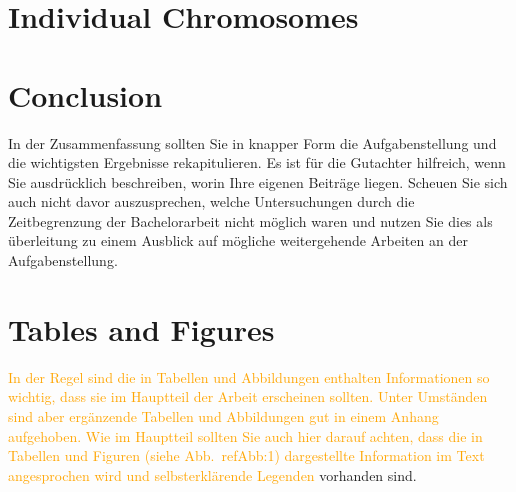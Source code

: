 \documentclass[a4paper,11pt,oneside,final,english,toc=bib,draft]{scrbook}
\begin{document}


\chapter{Individual Chromosomes} %
\label{cha:individual_chromosomes}


\chapter{Conclusion} %
\label{cha:conclusion}

In der Zusammenfassung sollten Sie in knapper Form die Aufgabenstellung 
und die wichtigsten Ergebnisse rekapitulieren. Es ist für die 
Gutachter hilfreich, wenn Sie ausdrücklich beschreiben, worin 
Ihre eigenen Beiträge liegen. Scheuen Sie sich auch nicht davor 
auszusprechen, welche Untersuchungen durch die Zeitbegrenzung der 
Bachelorarbeit nicht möglich waren und nutzen Sie dies als 
überleitung zu einem Ausblick auf mögliche weitergehende 
Arbeiten an der Aufgabenstellung.


\printbibliography

\appendix

\chapter{Tables and Figures} %
\label{cha:tables_and_figures}

\textcolor{orange}{In der Regel sind die in Tabellen und Abbildungen enthalten Informationen 
so wichtig, dass sie im Hauptteil der Arbeit erscheinen sollten. Unter 
Umständen sind aber ergänzende Tabellen und Abbildungen gut in einem 
Anhang aufgehoben. Wie im Hauptteil sollten Sie auch hier darauf achten, 
dass die in Tabellen und Figuren (siehe Abb.\ ref{Abb:1}) dargestellte 
Information im Text angesprochen wird und selbsterklärende Legenden}
vorhanden sind.

\medskip
\end{document}
